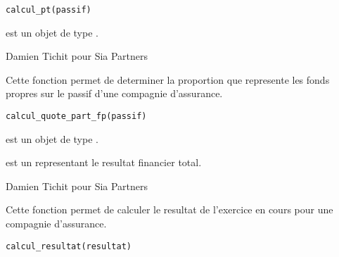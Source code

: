 \documentclass[a4paper]{book}
\begin{document}
%
\begin{Usage}
\begin{verbatim}
calcul_pt(passif)
\end{verbatim}
\end{Usage}
%
\begin{Arguments}
\begin{ldescription}
\item[\code{passif}] est un objet de type .
\end{ldescription}
\end{Arguments}
%
\begin{Author}\relax
Damien Tichit pour Sia Partners
\end{Author}
%
\begin{Description}\relax
Cette fonction permet de determiner la proportion que represente les fonds propres sur le passif d'une compagnie d'assurance.
\end{Description}
%
\begin{Usage}
\begin{verbatim}
calcul_quote_part_fp(passif)
\end{verbatim}
\end{Usage}
%
\begin{Arguments}
\begin{ldescription}
\item[\code{passif}] est un objet de type .

\item[\code{result\_fin}] est un  representant le resultat financier total.
\end{ldescription}
\end{Arguments}
%
\begin{Author}\relax
Damien Tichit pour Sia Partners
\end{Author}
%
\begin{Description}\relax
Cette fonction permet de calculer le resultat de l'exercice en cours pour une compagnie d'assurance.
\end{Description}
%
\begin{Usage}
\begin{verbatim}
calcul_resultat(resultat)
\end{verbatim}
\end{Usage}
\end{document}
